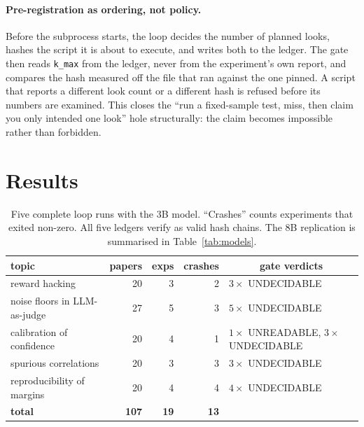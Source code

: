\documentclass[11pt]{article}
\newcommand{\code}[1]{{\small\texttt{#1}}}
\begin{document}
\paragraph{Pre-registration as ordering, not policy.} Before the subprocess
starts, the loop decides the number of planned looks, hashes the script it is
about to execute, and writes both to the ledger. The gate then reads
\code{k\_max} from the ledger, never from the experiment's own report, and
compares the hash measured off the file that ran against the one pinned. A
script that reports a different look count or a different hash is refused
before its numbers are examined. This closes the ``run a fixed-sample test,
miss, then claim you only intended one look'' hole structurally: the claim
becomes impossible rather than forbidden.

\section{Results}

\begin{table}[t]
\centering\small
\begin{tabular}{lrrrrl}
\toprule
topic & papers & exps & crashes & \multicolumn{2}{c}{gate verdicts}\\
\midrule
reward hacking                     & 20 & 3 & 2 & \multicolumn{2}{l}{$3\times$ UNDECIDABLE}\\
noise floors in LLM-as-judge       & 27 & 5 & 3 & \multicolumn{2}{l}{$5\times$ UNDECIDABLE}\\
calibration of confidence          & 20 & 4 & 1 & \multicolumn{2}{l}{$1\times$ UNREADABLE, $3\times$ UNDECIDABLE}\\
spurious correlations              & 20 & 3 & 3 & \multicolumn{2}{l}{$3\times$ UNDECIDABLE}\\
reproducibility of margins         & 20 & 4 & 4 & \multicolumn{2}{l}{$4\times$ UNDECIDABLE}\\
\midrule
\textbf{total} & \textbf{107} & \textbf{19} & \textbf{13} &
\end{tabular}
\caption{Five complete loop runs with the 3B model. ``Crashes'' counts
experiments that exited non-zero. All five ledgers verify as valid hash
chains. The 8B replication is summarised in Table~\ref{tab:models}.}
\label{tab:runs}
\end{table}
\end{document}

